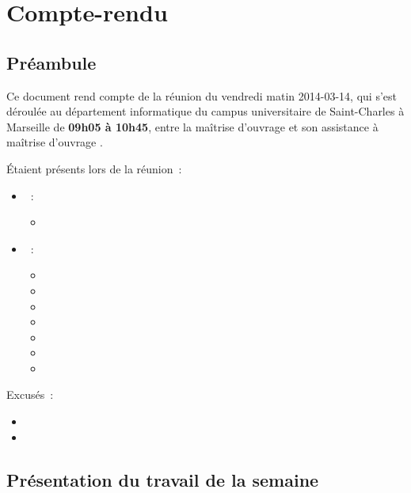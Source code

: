\documentclass[11pt,fleqn]{report}
\begin{document}
\ZMakeCover


\chapter*{Compte-rendu}
\setcounter{chapter}{1}

\section{Préambule}
Ce document rend compte de la réunion du vendredi matin 2014-03-14, qui s'est déroulée au département informatique du campus universitaire de Saint-Charles à Marseille de \textbf{09h05 à 10h45}, entre la maîtrise d'ouvrage \mo et son assistance à maîtrise d'ouvrage \amo.

Étaient présents lors de la réunion~:
\begin{itemize}
	\item \mo~:
	\begin{itemize}
		\item \Agopian
	\end{itemize}
	\item \amo~:
	\begin{itemize}
		\item \Cadon
		\item \Julien
		\item \Lericolais
		\item \Mezelle
		\item \Pachy
		\item \SuangaWeto
		\item \Toure
	\end{itemize}
\end{itemize}
Excusés~:
\begin{itemize}
	\item \Balde
	\item \Gairoard
\end{itemize}

\section{Présentation du travail de la semaine}
\end{document}
